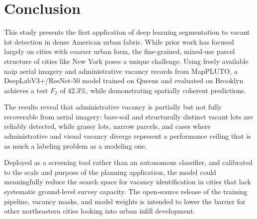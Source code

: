\chapter{Conclusion}
\label{ch:conclusion}

This study presents the first application of deep learning segmentation to vacant lot detection in dense American urban fabric. While prior work has focused largely on cities with coarser urban form, the fine-grained, mixed-use parcel structure of cities like New York poses a unique challenge. Using freely available \acrshort{naip} aerial imagery and administrative vacancy records from MapPLUTO, a DeepLabV3+/ResNet-50 model trained on Queens and evaluated on Brooklyn achieves a test $F_2$ of 42.3\%, while demonstrating spatially coherent predictions.

The results reveal that administrative vacancy is partially but not fully recoverable from aerial imagery: bare-soil and structurally distinct vacant lots are reliably detected, while grassy lots, narrow parcels, and cases where administrative and visual vacancy diverge represent a performance ceiling that is as much a labeling problem as a modeling one.

Deployed as a screening tool rather than an autonomous classifier, and calibrated to the scale and purpose of the planning application, the model could meaningfully reduce the search space for vacancy identification in cities that lack systematic ground-level survey capacity. The open-source release of the training pipeline, vacancy masks, and model weights is intended to lower the barrier for other northeastern cities looking into urban infill development.
